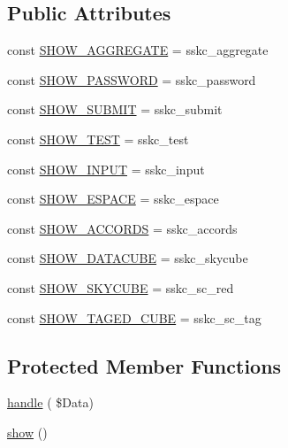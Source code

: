 \subsection*{Public Attributes}
\begin{DoxyCompactItemize}
\item 
const \hyperlink{class_page_show_sky_cube_ad1f83618461a3b0ffa3328e6e7bcb6e5}{S\+H\+O\+W\+\_\+\+A\+G\+G\+R\+E\+G\+A\+TE} = \textquotesingle{}sskc\+\_\+aggregate\textquotesingle{}
\item 
const \hyperlink{class_page_show_sky_cube_af65221b02d9c6a8a72c30c677e5a46d6}{S\+H\+O\+W\+\_\+\+P\+A\+S\+S\+W\+O\+RD} = \textquotesingle{}sskc\+\_\+password\textquotesingle{}
\item 
const \hyperlink{class_page_show_sky_cube_a24cf1523e50727abc61651112b9f4ff1}{S\+H\+O\+W\+\_\+\+S\+U\+B\+M\+IT} = \textquotesingle{}sskc\+\_\+submit\textquotesingle{}
\item 
const \hyperlink{class_page_show_sky_cube_ac3bed91d4160b436bb2917b535f2a43b}{S\+H\+O\+W\+\_\+\+T\+E\+ST} = \textquotesingle{}sskc\+\_\+test\textquotesingle{}
\item 
const \hyperlink{class_page_show_sky_cube_a4e9d75cf4e68abd7c9f3c91dd7e97479}{S\+H\+O\+W\+\_\+\+I\+N\+P\+UT} = \textquotesingle{}sskc\+\_\+input\textquotesingle{}
\item 
const \hyperlink{class_page_show_sky_cube_a096d8d981335531f28fbb1bdda2e1b45}{S\+H\+O\+W\+\_\+\+E\+S\+P\+A\+CE} = \textquotesingle{}sskc\+\_\+espace\textquotesingle{}
\item 
const \hyperlink{class_page_show_sky_cube_a2bf055bf06b09c6ce2e6558e2106b84e}{S\+H\+O\+W\+\_\+\+A\+C\+C\+O\+R\+DS} = \textquotesingle{}sskc\+\_\+accords\textquotesingle{}
\item 
const \hyperlink{class_page_show_sky_cube_a759ea0744174405ec97111a036e20963}{S\+H\+O\+W\+\_\+\+D\+A\+T\+A\+C\+U\+BE} = \textquotesingle{}sskc\+\_\+skycube\textquotesingle{}
\item 
const \hyperlink{class_page_show_sky_cube_a62bd9ab21181ca5eb90d08d7f219129e}{S\+H\+O\+W\+\_\+\+S\+K\+Y\+C\+U\+BE} = \textquotesingle{}sskc\+\_\+sc\+\_\+red\textquotesingle{}
\item 
const \hyperlink{class_page_show_sky_cube_a0087499349f820d5bee3bc85e1b80ad8}{S\+H\+O\+W\+\_\+\+T\+A\+G\+E\+D\+\_\+\+C\+U\+BE} = \textquotesingle{}sskc\+\_\+sc\+\_\+tag\textquotesingle{}
\end{DoxyCompactItemize}
\subsection*{Protected Member Functions}
\begin{DoxyCompactItemize}
\item 
\hyperlink{class_page_show_sky_cube_aff86dfb051c5c4bdba1226b3a6f7bfc0}{handle} ( \$Data)
\item 
\hyperlink{class_page_show_sky_cube_aea6c5561569163e3d33d75dea4635a3d}{show} ()
\end{DoxyCompactItemize}
